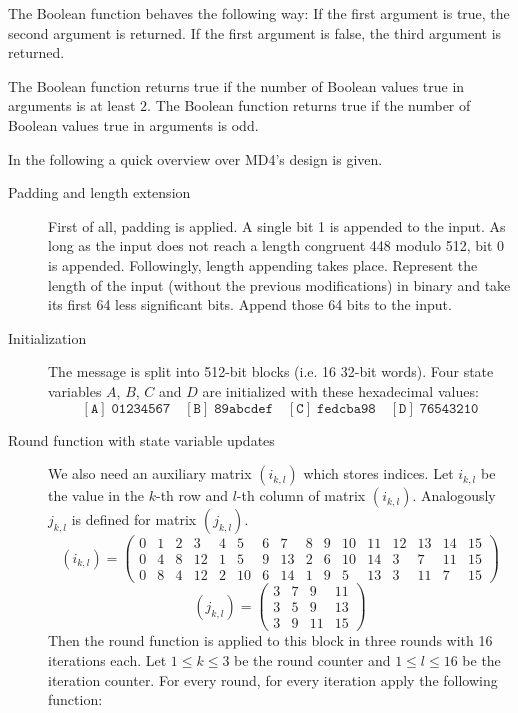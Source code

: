 \begin{defi}
  The Boolean  function behaves the following way:
  If the first argument is true, the second argument is returned.
  If the first argument is false, the third argument is returned.

  The Boolean  function returns true if the number
  of Boolean values true in arguments is at least $2$.
  The Boolean  function returns true if the number
  of Boolean values true in arguments is odd.
\end{defi}

In the following a quick overview over MD4's design is given.

\begin{description}
  \item[Padding and length extension]
    First of all, padding is applied. A single bit 1 is appended to the
    input. As long as the input does not reach a length congruent 448 modulo 512,
    bit 0 is appended.
    Followingly, length appending takes place. Represent the length of the input
    (without the previous modifications) in binary and take its first
    64 less significant bits. Append those 64 bits to the input.
  \item[Initialization]
    The message is split into 512-bit blocks (i.e. 16 32-bit words).
    Four state variables $A$, $B$, $C$ and $D$ are initialized with these
    hexadecimal values:
    \[
      \mathtt{[A]}\; \texttt{01234567} \quad
      \mathtt{[B]}\; \texttt{89abcdef} \quad
      \mathtt{[C]}\; \texttt{fedcba98} \quad
      \mathtt{[D]}\; \texttt{76543210}
    \]
  \item[Round function with state variable updates]
    We also need an auxiliary matrix $(i_{k,l})$ which stores indices.
    Let $i_{k,l}$ be the value in the $k$-th row and $l$-th column of matrix $(i_{k,l})$.
    Analogously $j_{k,l}$ is defined for matrix $(j_{k,l})$.
    \[
      (i_{k,l}) = \left(\begin{array}{cccccccccccccccc}
        0 & 1 & 2 & 3 & 4 & 5 & 6 & 7 & 8 & 9 & 10 & 11 & 12 & 13 & 14 & 15 \\
        0 & 4 & 8 & 12 & 1 & 5 & 9 & 13 & 2 & 6 & 10 & 14 & 3 & 7 & 11 & 15 \\
        0 & 8 & 4 & 12 & 2 & 10 & 6 & 14 & 1 & 9 & 5 & 13 & 3 & 11 & 7 & 15
      \end{array}\right)
    \] \[
      (j_{k,l}) = \begin{pmatrix}
        3 & 7 & 9 & 11 \\
        3 & 5 & 9 & 13 \\
        3 & 9 & 11 & 15
      \end{pmatrix}
    \]
    Then the round function is applied to this block in three rounds
    with 16 iterations each. Let $1 \leq k \leq 3$ be the round counter
    and $1 \leq l \leq 16$ be the iteration counter. For every round,
    for every iteration apply the following function:


\end{description}
